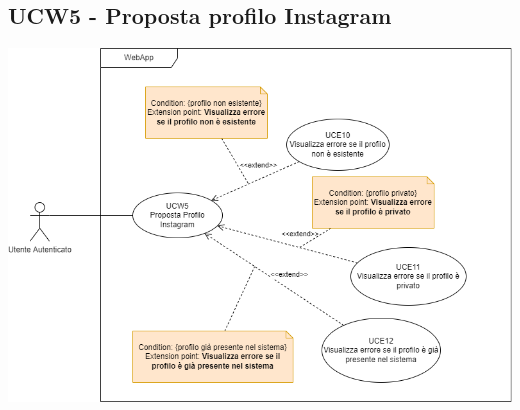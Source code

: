 \subsection{UCW5 - Proposta profilo Instagram}
\begin{center}
\includegraphics[scale=0.5]{UC_images/UCW5.png}
\end{center}
